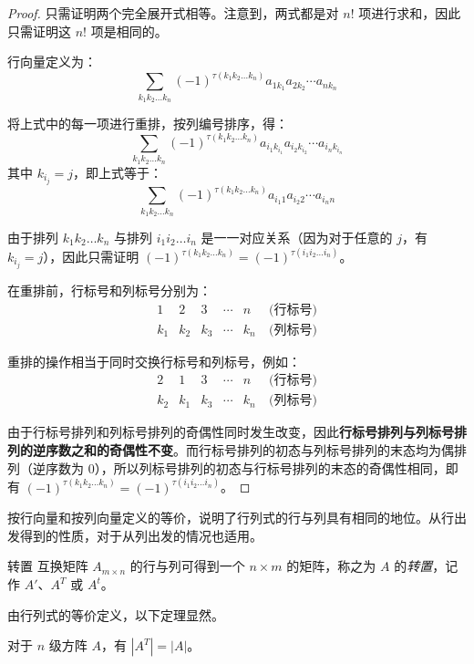\begin{proof}
	只需证明两个完全展开式相等。注意到，两式都是对 $n!$ 项进行求和，因此只需证明这 $n!$ 项是相同的。

	行向量定义为：
	$$
	\sum_{k_1 k_2 \ldots k_n} (-1)^{\tau(k_1 k_2 \ldots k_n)} a_{1k_1} a_{2k_2} \cdots a_{nk_n}
	$$

	将上式中的每一项进行重排，按列编号排序，得：
	$$
	\sum_{k_1 k_2 \ldots k_n} (-1)^{\tau(k_1 k_2 \ldots k_n)} a_{i_1 k_{i_1}} a_{i_2 k_{i_2}} \cdots a_{i_n k_{i_n}}
	$$
	其中 $k_{i_j} = j$，即上式等于：
	$$
	\sum_{k_1 k_2 \ldots k_n} (-1)^{\tau(k_1 k_2 \ldots k_n)} a_{i_1 1} a_{i_2 2} \cdots a_{i_n n}
	$$

	由于排列 $k_1 k_2 \ldots k_n$ 与排列 $i_1 i_2 \ldots i_n$ 是一一对应关系（因为对于任意的 $j$，有 $k_{i_j} = j$），因此只需证明 $(-1)^{\tau(k_1 k_2 \ldots k_n)} = (-1)^{\tau(i_1 i_2 \ldots i_n)}$。

	\bigskip

	在重排前，行标号和列标号分别为：
	$$
	\begin{matrix}
		1 & 2 & 3 & \cdots & n & \pod{\text{行标号}}
		\\
		k_1 & k_2 & k_3 & \cdots & k_n & \pod{\text{列标号}}
	\end{matrix}
	$$

	重排的操作相当于同时交换行标号和列标号，例如：
	$$
	\begin{matrix}
		2 & 1 & 3 & \cdots & n & \pod{\text{行标号}}
		\\
		k_2 & k_1 & k_3 & \cdots & k_n & \pod{\text{列标号}}
	\end{matrix}
	$$

	由于行标号排列和列标号排列的奇偶性同时发生改变，因此\textbf{行标号排列与列标号排列的逆序数之和的奇偶性不变}。而行标号排列的初态与列标号排列的末态均为偶排列（逆序数为 $0$），所以列标号排列的初态与行标号排列的末态的奇偶性相同，即有 $(-1)^{\tau(k_1 k_2 \ldots k_n)} = (-1)^{\tau(i_1 i_2 \ldots i_n)}$。
\end{proof}

按行向量和按列向量定义的等价，说明了行列式的行与列具有相同的地位。从行出发得到的性质，对于从列出发的情况也适用。

\begin{definition}{转置}
	互换矩阵 $A_{m \times n}$ 的行与列可得到一个 $n \times m$ 的矩阵，称之为 $A$ 的\emph{转置}，记作 $A'$、$A^T$ 或 $A^t$。
\end{definition}

由行列式的等价定义，以下定理显然。

\begin{theorem}
	对于 $n$ 级方阵 $A$，有 $|A^T| = |A|$。
\end{theorem}

